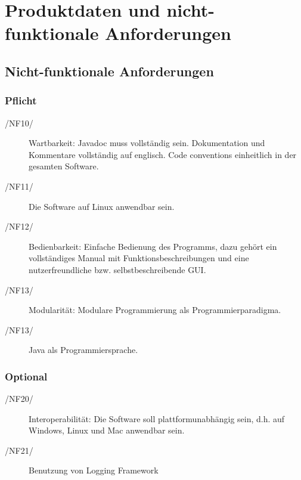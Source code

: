 \chapter{Produktdaten und nicht-funktionale Anforderungen}

	\section{Nicht-funktionale Anforderungen}
		\subsection*{Pflicht}
			\begin{description}
				\item [/NF10/] Wartbarkeit: Javadoc muss vollständig sein. Dokumentation und Kommentare vollständig auf englisch. Code conventions einheitlich in der gesamten Software.
				\item [/NF11/] Die Software auf Linux anwendbar sein.
				\item [/NF12/] Bedienbarkeit: Einfache Bedienung des Programms, dazu gehört ein vollständiges Manual mit Funktionsbeschreibungen und eine nutzerfreundliche bzw. selbstbeschreibende GUI.
				\item [/NF13/] Modularität: Modulare Programmierung als Programmierparadigma.
				\item [/NF13/] Java als Programmiersprache.
			\end{description}
		\subsection*{Optional}
			\begin{description}
				\item [/NF20/] Interoperabilität: Die Software soll plattformunabhängig sein, d.h. auf Windows, Linux und Mac anwendbar sein.
				\item [/NF21/] Benutzung von Logging Framework
			\end{description}
		
